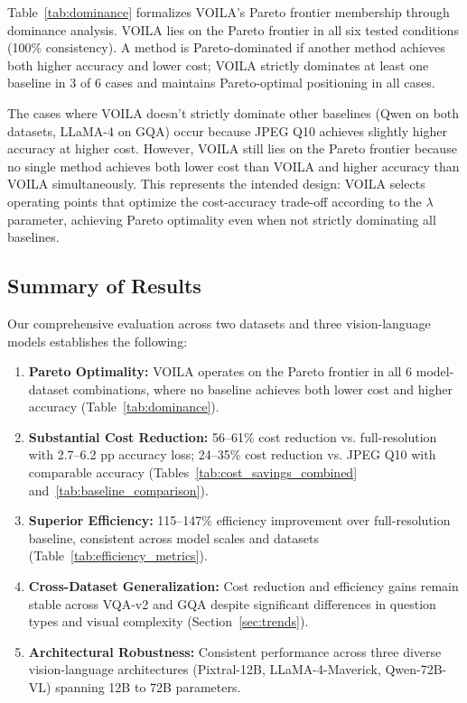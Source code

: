
Table~\ref{tab:dominance} formalizes VOILA's Pareto frontier membership through dominance analysis. VOILA lies on the Pareto frontier in all six tested conditions (100\% consistency). A method is Pareto-dominated if another method achieves both higher accuracy and lower cost; VOILA strictly dominates at least one baseline in 3 of 6 cases and maintains Pareto-optimal positioning in all cases.

The cases where VOILA doesn't strictly dominate other baselines (Qwen on both datasets, LLaMA-4 on GQA) occur because JPEG Q10 achieves slightly higher accuracy at higher cost. However, VOILA still lies on the Pareto frontier because no single method achieves both lower cost than VOILA and higher accuracy than VOILA simultaneously. This represents the intended design: VOILA selects operating points that optimize the cost-accuracy trade-off according to the $\lambda$ parameter, achieving Pareto optimality even when not strictly dominating all baselines.

\subsection{Summary of Results}
\label{sec:results_summary}

Our comprehensive evaluation across two datasets and three vision-language models establishes the following:

\begin{enumerate}
    \item \textbf{Pareto Optimality:} VOILA operates on the Pareto frontier in all 6 model-dataset combinations, where no baseline achieves both lower cost and higher accuracy (Table~\ref{tab:dominance}).
    
    \item \textbf{Substantial Cost Reduction:} 56--61\% cost reduction vs. full-resolution with 2.7--6.2 pp accuracy loss; 24--35\% cost reduction vs. JPEG Q10 with comparable accuracy (Tables~\ref{tab:cost_savings_combined} and~\ref{tab:baseline_comparison}).
    
    \item \textbf{Superior Efficiency:} 115--147\% efficiency improvement over full-resolution baseline, consistent across model scales and datasets (Table~\ref{tab:efficiency_metrics}).
    
    \item \textbf{Cross-Dataset Generalization:} Cost reduction and efficiency gains remain stable across VQA-v2 and GQA despite significant differences in question types and visual complexity (Section~\ref{sec:trends}).
    
    \item \textbf{Architectural Robustness:} Consistent performance across three diverse vision-language architectures (Pixtral-12B, LLaMA-4-Maverick, Qwen-72B-VL) spanning 12B to 72B parameters.
\end{enumerate}

